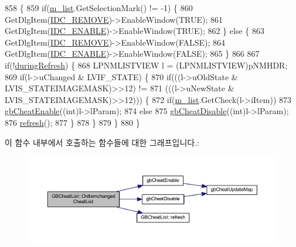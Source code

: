 \begin{DoxyCode}
858 \{
859   \textcolor{keywordflow}{if}(\mbox{\hyperlink{class_g_b_cheat_list_aca0eaf2ff30100f5d11e4c80193ad90e}{m\_list}}.GetSelectionMark() != -1) \{
860     GetDlgItem(\mbox{\hyperlink{resource_8h_aa8441a495432bef29886eed49bbaa08c}{IDC\_REMOVE}})->EnableWindow(TRUE);
861     GetDlgItem(\mbox{\hyperlink{resource_8h_a093c54af5e55f25a680ada00f278ac80}{IDC\_ENABLE}})->EnableWindow(TRUE);
862   \} \textcolor{keywordflow}{else} \{
863     GetDlgItem(\mbox{\hyperlink{resource_8h_aa8441a495432bef29886eed49bbaa08c}{IDC\_REMOVE}})->EnableWindow(FALSE);
864     GetDlgItem(\mbox{\hyperlink{resource_8h_a093c54af5e55f25a680ada00f278ac80}{IDC\_ENABLE}})->EnableWindow(FALSE);
865   \}
866   
867   \textcolor{keywordflow}{if}(!\mbox{\hyperlink{class_g_b_cheat_list_aba5dc0a50355411fd9c82f87fbdbeb2e}{duringRefresh}}) \{
868     LPNMLISTVIEW l = (LPNMLISTVIEW)pNMHDR;
869     \textcolor{keywordflow}{if}(l->uChanged & LVIF\_STATE) \{
870       \textcolor{keywordflow}{if}(((l->uOldState & LVIS\_STATEIMAGEMASK)>>12) !=
871          (((l->uNewState & LVIS\_STATEIMAGEMASK)>>12))) \{
872         \textcolor{keywordflow}{if}(\mbox{\hyperlink{class_g_b_cheat_list_aca0eaf2ff30100f5d11e4c80193ad90e}{m\_list}}.GetCheck(l->iItem))
873           \mbox{\hyperlink{gb_cheats_8cpp_aed1bdafc2cfd18d6345102077dcdca76}{gbCheatEnable}}((\textcolor{keywordtype}{int})l->lParam);
874         \textcolor{keywordflow}{else}
875           \mbox{\hyperlink{gb_cheats_8cpp_a5860b5a75e2297e4d2f2f69dde0ad689}{gbCheatDisable}}((\textcolor{keywordtype}{int})l->lParam);
876         \mbox{\hyperlink{class_g_b_cheat_list_a248cc28fa5e392d2f55d0f66ff6c5821}{refresh}}();
877       \}
878     \}
879   \}    
880 \}
\end{DoxyCode}
이 함수 내부에서 호출하는 함수들에 대한 그래프입니다.\+:
\nopagebreak
\begin{figure}[H]
\begin{center}
\leavevmode
\includegraphics[width=350pt]{class_g_b_cheat_list_a35c4625f3b1696bf7647d23831ae310b_cgraph}
\end{center}
\end{figure}
\mbox{\label{class_g_b_cheat_list_a354069c10c3804094ce2b4079588115e}} 
